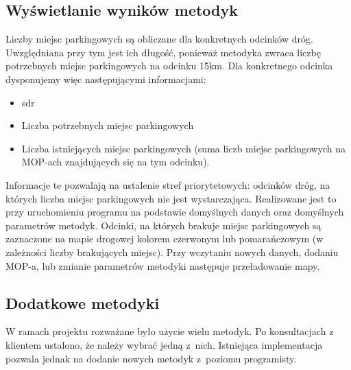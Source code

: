 \subsection{Wyświetlanie wyników metodyk}
Liczby miejsc parkingowych są obliczane dla konkretnych odcinków dróg.
Uwzględniana przy tym jest ich długość, ponieważ metodyka zwraca liczbę
potrzebnych miejsc parkingowych na odcinku 15km. Dla konkretnego odcinka
dysponujemy więc następującymi informacjami: 
\begin{itemize}
  \item \acrshort{sdr}
  \item Liczba potrzebnych miejsc parkingowych
  \item Liczba istniejących miejsc parkingowych (suma liczb miejsc
    parkingowych na MOP-ach znajdujących się na tym odcinku).
\end{itemize}
Informacje te pozwalają na ustalenie stref priorytetowych: odcinków dróg, na
których liczba miejsc parkingowych nie jest wystarczająca. Realizowane jest to
przy uruchomieniu programu na podstawie domyślnych danych oraz domyślnych
parametrów metodyk. Odcinki, na których brakuje miejsc parkingowych są
zaznaczone na mapie drogowej kolorem czerwonym lub pomarańczowym (w zależności
liczby brakujących miejsc). Przy wczytaniu nowych danych,
dodaniu MOP-a, lub zmianie parametrów metodyki następuje przeładowanie mapy. 

\subsection{Dodatkowe metodyki} 
W ramach projektu rozważane było użycie wielu metodyk. Po konsultacjach z
klientem ustalono, że należy wybrać jedną z~nich. Istniejąca implementacja
pozwala jednak na dodanie nowych metodyk z~poziomu
programisty.

